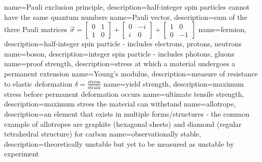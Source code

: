 {
    name=Pauli exclusion principle,
    description={half-integer spin particles cannot have the same quantum numbers}
}
{
    name=Pauli vector,
    description={sum of the three Pauli matrices $\vec{\sigma} = \begin{bmatrix} 0 & 1 \\ 1 & 0\end{bmatrix} + \begin{bmatrix} 0 & -i \\ i & 0\end{bmatrix} + \begin{bmatrix} 1 & 0 \\ 0 & -1\end{bmatrix}$}
}
{
    name=fermion,
    description={half-integer spin particle - includes electrons, protons, neutrons}
}
{
    name=boson,
    description={integer spin particle - includes photons, gluons}
}
{
    name=proof strength,
    description={stress at which a material undergoes a permanent extension}
}
{
    name=Young's modulus,
    description={measure of resistance to elastic deformation $\delta = \frac{\text{stress}}{\text{strain}}$}
}
{
    name=yield strength,
    description={maximum stress before permanent deformation occurs}
}
{
    name=ultimate tensile strength,
    description={maximum stress the material can withstand}
}
{
    name=allotrope,
    description={an element that exists in multiple forms/structures - the common example of allotropes are graphite (hexagonal sheets) and diamond (regular tetrahedral structure) for carbon}
}
{
    name=observationally stable,
    description={theoretically unstable but yet to be measured as unstable by experiment}
}





